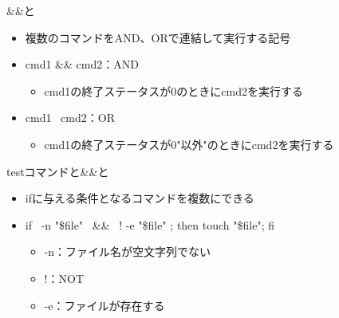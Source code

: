\documentclass[12pt,aspectratio=169]{beamer}
\begin{document}
\begin{frame}{\&\&と\textbar\textbar}

  \begin{itemize}
    \item 複数のコマンドをAND、ORで連結して実行する記号
    \item cmd1 \&\& cmd2：AND
    \begin{itemize}
      \item cmd1の終了ステータスが0のときにcmd2を実行する
    \end{itemize}
    \item cmd1 \textbar\textbar\ cmd2：OR
    \begin{itemize}
      \item cmd1の終了ステータスが0"以外"のときにcmd2を実行する
    \end{itemize}

  \end{itemize}

\end{frame}

\begin{frame}{testコマンドと\&\&と\textbar\textbar}

  \begin{itemize}
    \item ifに与える条件となるコマンドを複数にできる
    \item if \lbrack\ -n "\$file" \rbrack\ \&\& \lbrack\ ! -e "\$file" \rbrack; then touch "\$file"; fi
    \begin{itemize}
      \item -n：ファイル名が空文字列でない
      \item !：NOT
      \item -e：ファイルが存在する
    \end{itemize}

  \end{itemize}

\end{frame}
\end{document}
